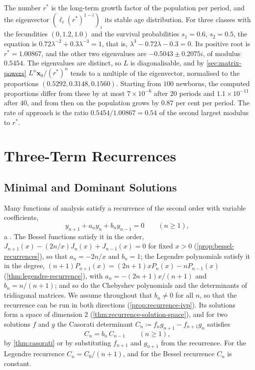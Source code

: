 The number $r^*$ is the long-term growth factor of the population per period, and the eigenvector $(\ell_i(r^*)^{1-i})_i$ its stable age distribution. For three classes with the fecundities $(0,1.2,1.0)$ and the survival probabilities $s_1=0.6$, $s_2=0.5$, the equation is $0.72\lambda^{-2}+0.3\lambda^{-3}=1$, that is, $\lambda^3-0.72\lambda-0.3=0$. Its positive root is $r^*=1.00867$, and the other two eigenvalues are $-0.5043\pm0.2075i$, of modulus $0.5454$. The eigenvalues are distinct, so $L$ is diagonalisable, and by \cref{sec:matrix-powers} $L^n\mathbf x_0/(r^*)^n$ tends to a multiple of the eigenvector, normalised to the proportions $(0.5292,0.3148,0.1560)$. Starting from $100$ newborns, the computed proportions differ from these by at most $7\times10^{-6}$ after $20$ periods and $1.1\times10^{-11}$ after $40$, and from then on the population grows by $0.87$ per cent per period. The rate of approach is the ratio $0.5454/1.00867=0.54$ of the second largest modulus to $r^*$.

\section{Three-Term Recurrences}
\label{sec:three-term}

\subsection{Minimal and Dominant Solutions}

Many functions of analysis satisfy a recurrence of the second order with variable coefficients,
\begin{equation}
y_{n+1}+a_ny_n+b_ny_{n-1}=0\qquad(n\ge1),
\label{eq:three-term}
\end{equation}
a . The Bessel functions satisfy it in the order, $J_{n+1}(x)-(2n/x)J_n(x)+J_{n-1}(x)=0$ for fixed $x>0$ (\cref{prop:bessel-recurrences}), so that $a_n=-2n/x$ and $b_n=1$; the Legendre polynomials satisfy it in the degree, $(n+1)P_{n+1}(x)=(2n+1)xP_n(x)-nP_{n-1}(x)$ (\cref{thm:legendre-recurrence}), with $a_n=-(2n+1)x/(n+1)$ and $b_n=n/(n+1)$; and so do the Chebyshev polynomials and the determinants of tridiagonal matrices. We assume throughout that $b_n\ne0$ for all $n$, so that the recurrence can be run in both directions (\cref{prop:recurrence-ivp}). Its solutions form a space of dimension $2$ (\cref{thm:recurrence-solution-space}), and for two solutions $f$ and $g$ the Casorati determinant $C_n\coloneqq f_ng_{n+1}-f_{n+1}g_n$ satisfies
\begin{equation}
C_n=b_n\,C_{n-1}\qquad(n\ge1),
\label{eq:three-term-casorati}
\end{equation}
by \cref{thm:casorati} or by substituting $f_{n+1}$ and $g_{n+1}$ from the recurrence. For the Legendre recurrence $C_n=C_0/(n+1)$, and for the Bessel recurrence $C_n$ is constant.

